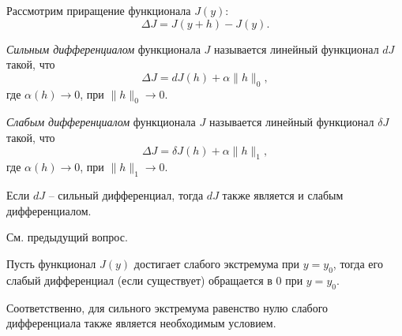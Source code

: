 
Рассмотрим приращение функционала $J (y)$:
\[
  \Delta J = J(y + h) - J(y).
\]

\begin{definition}
  \emph{Сильным дифференциалом} функционала $J$ называется линейный функционал $dJ$ такой, что
  \[
    \Delta J = dJ (h) + \alpha \|h\|_0,
  \]
  где $\alpha(h) \to 0$, при $\|h\|_0 \to 0$.
\end{definition}

\begin{definition}
  \emph{Слабым дифференциалом} функционала $J$ называется линейный функционал $\delta J$ такой, что
  \[
    \Delta J = \delta J (h) + \alpha \|h\|_1,
  \]
  где $\alpha(h) \to 0$, при $\|h\|_1 \to 0$.
\end{definition}

Если $dJ$ -- сильный дифференциал, тогда $dJ$ также является и слабым дифференциалом.


См. предыдущий вопрос.

\begin{theorem}
  Пусть функционал $J(y)$ достигает слабого экстремума при $y = y_0$, тогда его слабый
  дифференциал (если существует) обращается в 0 при $y = y_0$.
\end{theorem}

Соответственно, для сильного экстремума равенство нулю слабого дифференциала также является необходимым условием.

